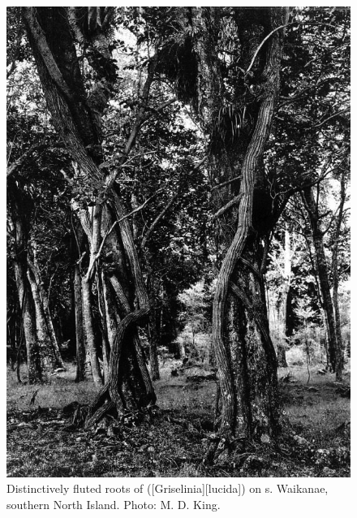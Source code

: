 \begin{figure}[t]
	\begin{minipage}[t]{\textwidth}
		\begin{minipage}[t]{(\textwidth-\fgap) * \real{0.495}}
			\centering
			\includegraphics[width=\textwidth]{graphics/figure46puka-roots.jpg}
			\caption[Distinctively fluted roots of puka on kohekohes]{Distinctively fluted roots of  ([Griselinia][lucida]) on s.
			Waikanae, southern North Island.
			Photo: M. D. King.}%
			\label{fig:46puka-roots}
		\end{minipage}\hspace{\fgap}%
		\begin{minipage}[t]{(\textwidth-\fgap) * \real{0.505}}
			\centering

\end{minipage}
\end{minipage}
\end{figure}
